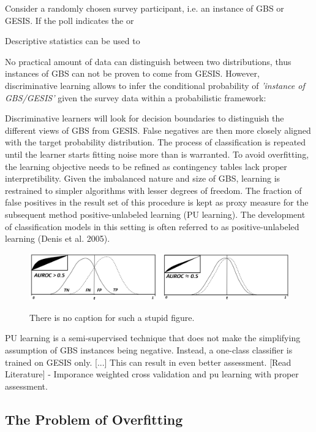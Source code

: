 Consider a randomly chosen survey participant, i.e. an instance of GBS or GESIS. If the poll indicates the or

Descriptive statistics can be used to 
 
No practical amount of data can distinguish between two distributions, thus instances of GBS can not be proven to come from GESIS. However, discriminative learning allows to infer the conditional probability of \textit{'instance of GBS/GESIS'} given the survey data within a probabilistic framework:

Discriminative learners will look for decision boundaries to distinguish the different views of GBS from GESIS. False negatives are then more closely aligned with the target probability distribution. The process of classification is repeated until the learner starts fitting noise more than is warranted. To avoid overfitting, the learning objective needs to be refined as contingency tables lack proper interpretibility. Given the imbalanced nature and size of GBS, learning is restrained to simpler algorithms with lesser degrees of freedom. The fraction of false positives in the result set of this procedure is kept as proxy measure for the subsequent method positive-unlabeled learning (PU learning). The development of classiﬁcation models in this setting is often referred to as positive-unlabeled learning (Denis et al. 2005).

\vspace{15pt}
\begin{figure}[ht]
	\begin{center}
		\includegraphics[scale=0.48,angle=0]{fig/roc_example}
		\label{project}
		\caption{There is no caption for such a stupid figure.}
	\end{center}
\end{figure}

PU learning is a semi-supervised technique that does not make the simplifying assumption of GBS instances being negative. Instead, a one-class classifier is trained on GESIS only. [...] This can result in even better assessment. [Read Literature] - Imporance weighted cross validation and pu learning with proper assessment.

\subsection{The Problem of Overfitting}

